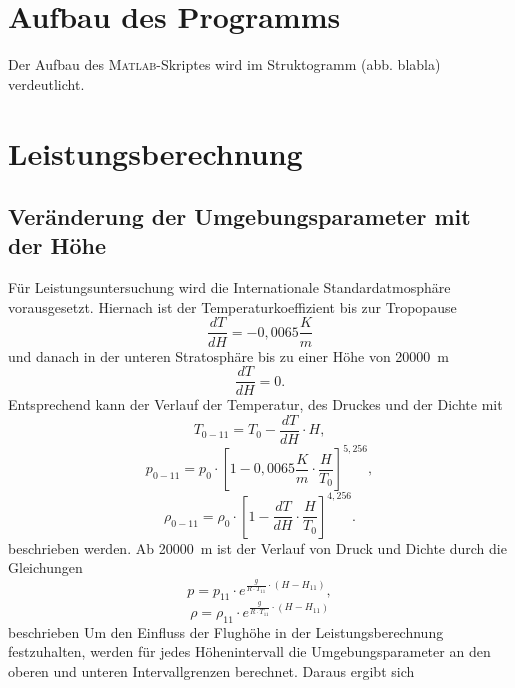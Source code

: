 \section{Aufbau des Programms}
\label{sec:aufbau_des_programms}
Der Aufbau des \textsc{Matlab}-Skriptes wird im Struktogramm (abb. blabla) verdeutlicht.
\section{Leistungsberechnung}
\label{sec:leistungsberechnung}
\subsection{Veränderung der Umgebungsparameter mit der Höhe}
Für Leistungsuntersuchung wird die Internationale Standardatmosphäre vorausgesetzt. Hiernach ist der Temperaturkoeffizient bis zur Tropopause
\begin{equation}
	\frac{dT}{dH} = -0,0065\frac{K}{m}
\end{equation}
und danach in der unteren Stratosphäre bis zu einer Höhe von \SI{20000}{m}
\begin{equation}
	\frac{dT}{dH} = 0.
\end{equation}
Entsprechend kann der Verlauf der Temperatur, des Druckes und der Dichte mit
\begin{equation}
	T_{0-11} = T_0 - \frac{dT}{dH}\cdot H,
\end{equation}
\begin{equation}
	p_{0-11} = p_0\cdot [1-0,0065\frac{K}{m}\cdot \frac{H}{T_0}]^{5,256},
\end{equation}
\begin{equation}
	\rho_{0-11} = \rho_0 \cdot [1-\frac{dT}{dH}\cdot \frac{H}{T_0}]^{4,256}.
\end{equation}
beschrieben werden. Ab \SI{20000}{m} ist der Verlauf von Druck und Dichte durch die Gleichungen
\begin{equation}
	p = p_{11}\cdot e^{\frac{g}{R\cdot T_{11}}\cdot (H-H_{11})},
\end{equation} 
\begin{equation}
	\rho = \rho_{11}\cdot e^{\frac{g}{R\cdot T_{11}}\cdot (H-H_{11})}
\end{equation}
beschrieben
Um den Einfluss der Flughöhe in der Leistungsberechnung festzuhalten, werden für jedes Höhenintervall die Umgebungsparameter an den oberen und unteren Intervallgrenzen berechnet. Daraus ergibt sich  

